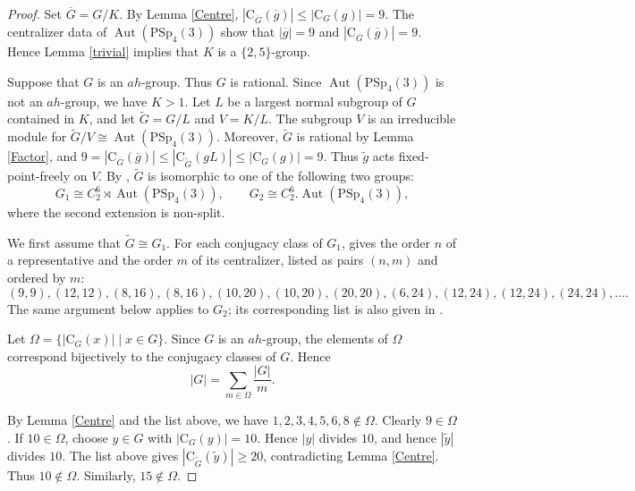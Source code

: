 \documentclass[11pt]{article}
\providecommand{\PSp}{{\mathrm{PSp}}}
\providecommand{\C}{{\mathrm{C}}}
\providecommand{\Aut}{{\operatorname{Aut}}}
\providecommand{\olg}{{\overline{g}}}
\providecommand{\olG}{{\overline{G}}}
\providecommand{\wtg}{{\widetilde{g}}}
\begin{document}
  \begin{proof}
      Set $\olG=G/K$.
      By Lemma \ref{Centre}, $|\C_{\olG}(\olg)|\leq |\C_G(g)|=9$.
      The centralizer data of $\Aut(\PSp_4(3))$ show that $|\olg|=9$ and
      $|\C_{\olG}(\olg)|=9$. Hence Lemma \ref{trivial} implies that $K$ is
      a
      $\{2,5\}$-group.

      Suppose that $G$ is an $ah$-group. Thus $G$ is rational. Since
      $\Aut(\PSp_4(3))$ is not an $ah$-group, we have $K>1$.
      Let $L$ be a largest normal subgroup of $G$ contained in $K$, and
      let $\widetilde G=G/L$ and $V=K/L$.
      The subgroup $V$ is an irreducible module for $\widetilde G/V\cong \Aut(\PSp_4(3))$. 
      Moreover, $\widetilde G$ is rational by Lemma \ref{Factor}, and
      $
          9=|\C_{\olG}(\olg)|
          \leq |\C_{\widetilde G}(gL)|
          \leq |\C_G(g)|=9.
     $
      Thus $\wtg$ acts fixed-point-freely on $V$.
      By \cite[Code 6]{Git}, $\widetilde G$ is isomorphic to one of the
      following
      two groups:
      \[
          G_1\cong C_2^6\rtimes \Aut(\PSp_4(3)),
          \qquad
          G_2\cong C_2^6.\Aut(\PSp_4(3)),
      \]
      where the second extension is non-split.

      We first assume that $\widetilde G\cong G_1$. For each conjugacy
      class of
      $G_1$, \cite[Code 6]{Git} gives the order $n$ of a representative
      and the
      order $m$ of its centralizer, listed as pairs $(n,m)$ and ordered by
      $m$:
      \[
      (9,9),(12,12),(8,16),(8,16),(10,20),(10,20),(20,20),
      (6,24),(12,24),(12,24),(24,24),\ldots .
      \]
      The same argument below applies to $G_2$; its corresponding list is
      also
      given in \cite[Code 6]{Git}.

      Let $\Omega=\{|\C_G(x)|\mid x\in G\}$.
      Since $G$ is an $ah$-group, the elements of $\Omega$ correspond
      bijectively
      to the conjugacy classes of $G$. Hence
      \[
          |G|=\sum_{m\in \Omega}\frac{|G|}{m}.
      \]

      By Lemma \ref{Centre} and the list above, we have $1,2,3,4,5,6,8\notin \Omega $.
      Clearly $9\in \Omega$. If $10\in\Omega$, choose $y\in G$ with
      $|\C_G(y)|=10$. Hence $|y|$ divides $10$, and hence $|\widetilde y|$
      divides
      $10$. The list above gives $|\C_{\widetilde G}(\widetilde y)|\geq
      20$,
      contradicting Lemma \ref{Centre}. Thus $10\notin\Omega$. Similarly,
      $15\notin\Omega$.


\end{proof}
\end{document}
